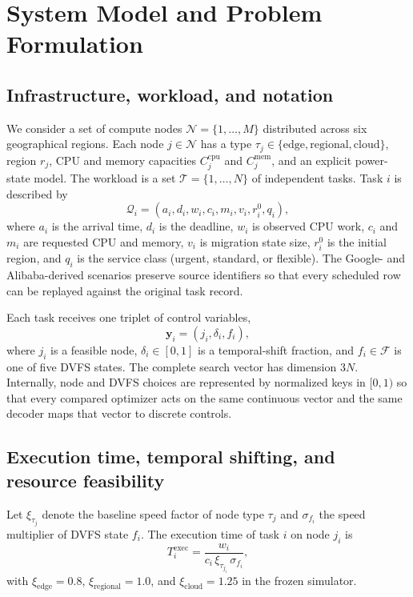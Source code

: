 \section{System Model and Problem Formulation}
\label{sec:model}

\subsection{Infrastructure, workload, and notation}

We consider a set of compute nodes $\mathcal{N}=\{1,\ldots,M\}$ distributed across six geographical regions. Each node $j\in\mathcal{N}$ has a type $\tau_j\in\{\text{edge},\text{regional},\text{cloud}\}$, region $r_j$, CPU and memory capacities $C^{\mathrm{cpu}}_j$ and $C^{\mathrm{mem}}_j$, and an explicit power-state model. The workload is a set $\mathcal{T}=\{1,\ldots,N\}$ of independent tasks. Task $i$ is described by
\begin{equation}
\mathcal{Q}_i=\left(a_i,d_i,w_i,c_i,m_i,v_i,r_i^0,q_i\right),
\end{equation}
where $a_i$ is the arrival time, $d_i$ is the deadline, $w_i$ is observed CPU work, $c_i$ and $m_i$ are requested CPU and memory, $v_i$ is migration state size, $r_i^0$ is the initial region, and $q_i$ is the service class (urgent, standard, or flexible). The Google- and Alibaba-derived scenarios preserve source identifiers so that every scheduled row can be replayed against the original task record.

Each task receives one triplet of control variables,
\begin{equation}
\mathbf{y}_i=\left(j_i,\delta_i,f_i\right),
\label{eq:decision-triplet}
\end{equation}
where $j_i$ is a feasible node, $\delta_i\in[0,1]$ is a temporal-shift fraction, and $f_i\in\mathcal{F}$ is one of five DVFS states. The complete search vector has dimension $3N$. Internally, node and DVFS choices are represented by normalized keys in $[0,1)$ so that every compared optimizer acts on the same continuous vector and the same decoder maps that vector to discrete controls.

\subsection{Execution time, temporal shifting, and resource feasibility}

Let $\xi_{\tau_j}$ denote the baseline speed factor of node type $\tau_j$ and $\sigma_{f_i}$ the speed multiplier of DVFS state $f_i$. The execution time of task $i$ on node $j_i$ is
\begin{equation}
T^{\mathrm{exec}}_i=\frac{w_i}{c_i\,\xi_{\tau_{j_i}}\,\sigma_{f_i}},
\label{eq:runtime}
\end{equation}
with $\xi_{\mathrm{edge}}=0.8$, $\xi_{\mathrm{regional}}=1.0$, and $\xi_{\mathrm{cloud}}=1.25$ in the frozen simulator.

